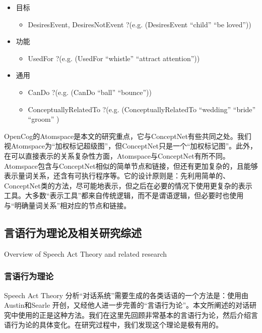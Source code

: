 \begin{itemize}
\item 目标
\begin{itemize}
\item DesiresEvent, DesiresNotEvent ?(e.g. (DesiresEvent ``child'' ``be loved''))
\end{itemize}

\item 功能
\begin{itemize}
\item UsedFor ?(e.g. (UsedFor ``whistle'' ``attract attention''))
\end{itemize}

\item 通用
\begin{itemize}
\item CanDo ?(e.g. (CanDo ``ball'' ``bounce''))
\item ConceptuallyRelatedTo ?(e.g. (ConceptuallyRelatedTo ``wedding'' ``bride'' ``groom'' )
\end{itemize}
\end{itemize}


OpenCog的Atomspace是本文的研究重点，它与ConceptNet有些共同之处。我们视Atomspace为“加权标记超级图”，但ConceptNet只是一个“加权标记图”。此外，在可以直接表示的关系复杂性方面，Atomspace与ConceptNet有所不同。Atomspace包含与ConceptNet相似的简单节点和链接，但还有更加复杂的，且能够表示量词关系，还含有可执行程序等。它的设计原则是：先利用简单的、ConceptNet类的方法，尽可能地表示，但之后在必要的情况下使用更复杂的表示工具。大多数“表示工具”都来自传统逻辑，而不是谓语逻辑，但必要时也使用与“明确量词关系”相对应的节点和链接。

\subsection{言语行为理论及相关研究综述}{Overview of Speech Act Theory and related research}
\label{sec:speechAct}

\subsubsection{言语行为理论}{Speech Act Theory}
分析“对话系统”需要生成的各类话语的一个方法是：使用由Austin\cite{Austin2005}和Searle\cite{Searle1969} 开创，又经他人进一步完善的“言语行为论”。本文所阐述的对话研究中使用的正是这种方法。我们在这里先回顾非常基本的言语行为论，然后介绍言语行为论的具体变化。在研究过程中，我们发现这个理论是极有用的。

